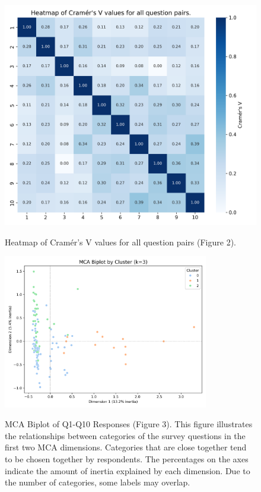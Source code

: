 \documentclass{article}
\begin{document}
\begin{figure}[htbp]

	{\includegraphics[width=\textwidth, keepaspectratio]{figs/cramers_v_heatmap_figure2.png}}

	\caption{Heatmap of Cramér's V values for all question pairs (Figure 2).}\label{fig:cramers_v_heatmap}

\end{figure}%

\begin{figure}[htbp]
	\centering
	{\includegraphics[width=0.8\textwidth, keepaspectratio]{figs/mca_biplot_clusters_figure3.png}}
	\caption{MCA Biplot of Q1-Q10 Responses (Figure 3). This figure illustrates the relationships between categories of the survey questions in the first two MCA dimensions. Categories that are close together tend to be chosen together by respondents. The percentages on the axes indicate the amount of inertia explained by each dimension. Due to the number of categories, some labels may overlap.}
	\label{fig:mca_biplot}
\end{figure}%
\end{document}
